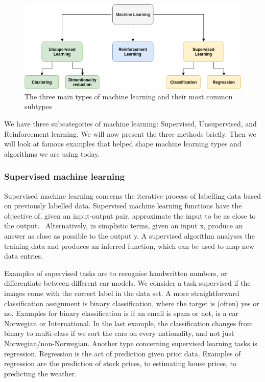     \begin{figure}[h]
        \centering
        \includegraphics[scale=0.6]{background/figures/ML_types.png}
        \caption{The three main types of machine learning and their most common subtypes}
    \label{fig:ML_types} 
    \end{figure}

We have three subcategories of machine learning: Supervised, Unsupervised, and Reinforcement learning. 
We will now present the three methods briefly. Then we will look at famous examples that helped shape machine learning types and algorithms we are using today.

\subsubsection{Supervised machine learning}
Supervised machine learning concerns the iterative process of labelling data based on previously labelled data.  Supervised machine learning functions have the objective of, given an input-output pair, approximate the input to be as close to the output.~\cite{AI:ModernApproach} Alternatively, in simplistic terms, given an input x, produce an answer as close as possible to the output y.
A supervised algorithm analyses the training data and produces an inferred function, which can be used to map new data entries. 


Examples of supervised tasks are to recognise handwritten numbers, or differentiate between different car models. We consider a task supervised if the images come with the correct label in the data set. 
A more straightforward classification assignment is binary classification, where the target is (often) yes or no. Examples for binary classification is if an email is spam or not, is a car Norwegian or International. In the last example, the classification changes from binary to multi-class if we sort the cars on every nationality, and not just Norwegian/non-Norwegian. Another type concerning supervised learning tasks is regression. Regression is the act of prediction given prior data. Examples of regression are the prediction of stock prices, to estimating house prices, to predicting the weather.


